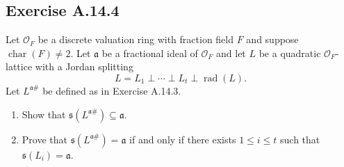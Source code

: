 \documentclass[12pt, a4paper]{article}
\begin{document}
\subsection*{Exercise A.14.4}
Let $\mathcal{O}_F$ be a discrete valuation ring with fraction field $F$ and suppose $\operatorname{char}(F) \neq 2$. Let $\mathfrak{a}$ be a fractional ideal of $\mathcal{O}_F$ and let $L$ be a quadratic $\mathcal{O}_F$-lattice with a Jordan splitting
\[ L = L_1 \perp \cdots \perp L_t \perp \operatorname{rad}(L). \]
Let $L^{\mathfrak{a}\#}$ be defined as in Exercise A.14.3.
\begin{enumerate}
    \item Show that $\mathfrak{s}(L^{\mathfrak{a}\#}) \subseteq \mathfrak{a}$.
    \item Prove that $\mathfrak{s}(L^{\mathfrak{a}\#}) = \mathfrak{a}$ if and only if there exists $1 \le i \le t$ such that $\mathfrak{s}(L_i) = \mathfrak{a}$.
\end{enumerate}
\end{document}
